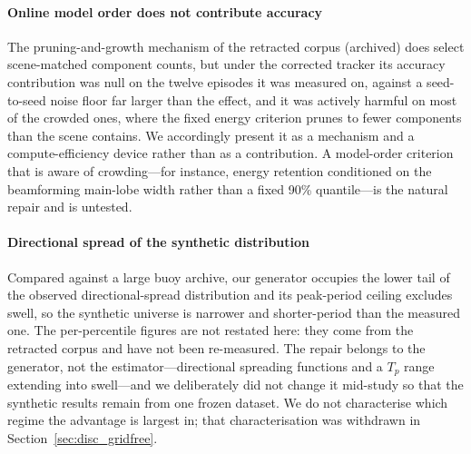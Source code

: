\documentclass[review]{elsarticle}
\begin{document}
\paragraph{Online model order does not contribute accuracy}
The
pruning-and-growth mechanism of the retracted corpus (archived) does select
scene-matched component counts, but under the corrected tracker its
accuracy contribution was null on the twelve episodes it was measured on, against a
seed-to-seed noise floor far larger than the effect, and it was actively harmful on
most of the crowded ones, where the fixed energy criterion prunes to fewer
components than the scene contains.  We accordingly present it as a mechanism and a
compute-efficiency device rather than as a contribution.  A model-order
criterion that is aware of crowding---for instance, energy retention
conditioned on the beamforming main-lobe width rather than a fixed 90\%
quantile---is the natural repair and is untested.

\paragraph{Directional spread of the synthetic distribution}
Compared against a large
buoy archive, our generator occupies the lower tail of the observed
directional-spread distribution and its peak-period ceiling excludes swell, so the
synthetic universe is narrower and shorter-period than the measured one. The
per-percentile figures are not restated here: they come from the retracted corpus
and have not been re-measured. The repair belongs to the generator, not the
estimator---directional spreading functions and a $T_p$ range extending into
swell---and we deliberately did not change it mid-study so that the synthetic
results remain from one frozen dataset. We do not characterise which regime the
advantage is largest in; that characterisation was withdrawn in
Section~\ref{sec:disc_gridfree}.
\end{document}
